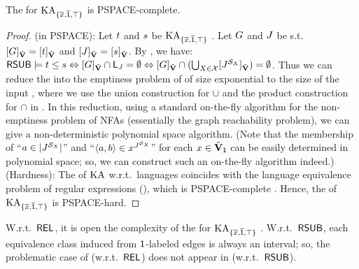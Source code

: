 \begin{theorem}\label{theorem: PSPACE-complete}
    The  for $\mathrm{KA}_{\{\overline{x}, \overline{\mathsf{1}}, \top\}}$ is PSPACE-complete.
\end{theorem}
\begin{proof}
    (in PSPACE):
    Let $\term[1]$ and $\term[2]$ be $\mathrm{KA}_{\{\overline{x}, \overline{\mathsf{1}}, \top\}}$ .
    Let $\graph$ and $\graph[3]$ be  s.t.\ $\ljump{\graph}_{\tilde{\vsig}} = \ljump{\term[1]}_{\tilde{\vsig}}$ and $\ljump{\graph[3]}_{\tilde{\vsig}} = \ljump{\term[2]}_{\tilde{\vsig}}$.
    By , we have:
    $\RSUB \models \term[1] \le \term[2]
    \Leftrightarrow \ljump{\graph[1]}_{\tilde{\vsig}} \cap \const{L}_{\graph[3]} = \emptyset
    \Leftrightarrow \ljump{\graph}_{\tilde{\vsig}} \cap (\bigcup_{X \in \mathcal{X}} \ljump{\graph[3]^{\FillS_{X}}}_{\tilde{\vsig}}) = \emptyset$.
    Thus we can reduce the  into the emptiness problem of  of size exponential to the size of the input ,
    where we use the union construction for $\cup$ and the product construction for $\cap$ in .
    In this reduction, using a standard on-the-fly algorithm for the non-emptiness problem of NFAs (essentially the graph reachability problem), we can give a non-deterministic polynomial space algorithm.
    (Note that the membership of ``$a \in \univ{\graph[3]^{\FillS_{X}}}$'' and ``$\tuple{a, b} \in x^{\graph[3]^{\FillS_{X}}}$'' for each $x \in \tilde{\mathbf{V}}_{\mathsf{1}}$ can be easily determined in polynomial space; so, we can construct such an on-the-fly algorithm indeed.)
    (Hardness):
    The  of $\mathrm{KA}$ w.r.t.\ languages coincides with the language equivalence problem of regular expressions (), which is PSPACE-complete \cite{meyerEquivalenceProblemRegular1972}.
    Hence, the  of $\mathrm{KA}_{\{\overline{x}, \overline{\mathsf{1}}, \top\}}$ is PSPACE-hard.
\end{proof}

\begin{remark}\label{remark: REL}
    W.r.t.\ $\mathsf{REL}$, it is open the complexity of the  for $\mathrm{KA}_{\{\overline{x}, \overline{\mathsf{1}}, \top\}}$ \cite[Remark 45]{nakamuraExistentialCalculiRelations2023}.
    W.r.t.\ $\mathsf{RSUB}$, each equivalence class induced from $\mathsf{1}$-labeled edges is always an interval;
    so, the problematic case of \cite[Remark 45]{nakamuraExistentialCalculiRelations2023} (w.r.t.\ $\mathsf{REL}$) does not appear in  (w.r.t.\ $\mathsf{RSUB}$).
    \lipicsEnd
\end{remark}

